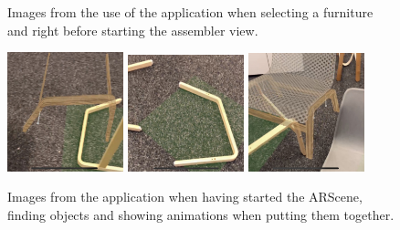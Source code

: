 \begin{figure}[!hbtp]
\begin{center}
\caption{Images from the use of the application when selecting a furniture and right before starting the assembler view.}
\label{fig:applicationSelection}
\end{center}
\end{figure}

\begin{figure}[!hbtp]
\begin{center}
\includegraphics[width = 0.3\textwidth]{./Images/Application4}
\includegraphics[width = 0.3\textwidth]{./Images/Application5}
\includegraphics[width = 0.3\textwidth]{./Images/Application6}
\caption{Images from the application when having started the ARScene, finding objects and showing animations when putting them together.}
\label{fig:applicationAssembler}
\end{center}
\end{figure}

\newpage